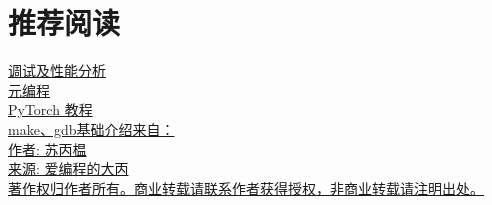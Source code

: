 \documentclass[UTF8]{ctexart}
\begin{document}
\section{推荐阅读}
\href{https://missing-semester-cn.github.io/2020/debugging-profiling/}{调试及性能分析}
\\
\indent \href{https://missing-semester-cn.github.io/2020/metaprogramming/}{元编程}
\\
\indent \href{https://www.runoob.com/pytorch/pytorch-tutorial.html}{PyTorch 教程}
\\
\indent \href{https://subingwen.cn/}{make、gdb基础介绍来自：\\\indent \qquad 作者: 苏丙榅\\
\indent \qquad 来源: 爱编程的大丙\\
\indent \qquad 著作权归作者所有。商业转载请联系作者获得授权，非商业转载请注明出处。
}
\end{document}
